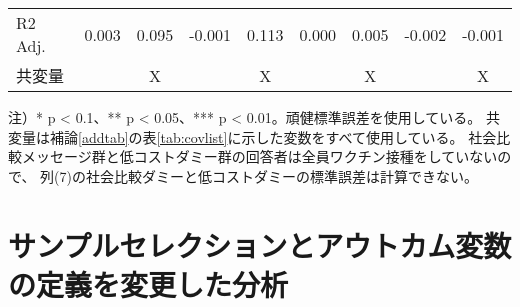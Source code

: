 \documentclass[
  11pt,
  a4paper,
]{article}
\begin{document}
\begin{table}
\begin{threeparttable}
\begin{tabular}[t]{lcccccccc}
R2 Adj. & 0.003 & 0.095 & -0.001 & 0.113 & 0.000 & 0.005 & -0.002 & -0.001\\
共変量 &  & X &  & X &  & X &  & X\\
\bottomrule
\end{tabular}
\begin{tablenotes}
\item 注）* p < 0.1、** p < 0.05、*** p < 0.01。頑健標準誤差を使用している。 共変量は補論\ref{addtab}の表\ref{tab:covlist}に示した変数をすべて使用している。 社会比較メッセージ群と低コストダミー群の回答者は全員ワクチン接種をしていないので、 列(7)の社会比較ダミーと低コストダミーの標準誤差は計算できない。
\end{tablenotes}
\end{threeparttable}
\end{table}

\clearpage

\hypertarget{ux30b5ux30f3ux30d7ux30ebux30bbux30ecux30afux30b7ux30e7ux30f3ux3068ux30a2ux30a6ux30c8ux30abux30e0ux5909ux6570ux306eux5b9aux7fa9ux3092ux5909ux66f4ux3057ux305fux5206ux6790}{%
\section{サンプルセレクションとアウトカム変数の定義を変更した分析}\label{ux30b5ux30f3ux30d7ux30ebux30bbux30ecux30afux30b7ux30e7ux30f3ux3068ux30a2ux30a6ux30c8ux30abux30e0ux5909ux6570ux306eux5b9aux7fa9ux3092ux5909ux66f4ux3057ux305fux5206ux6790}}
\end{document}
